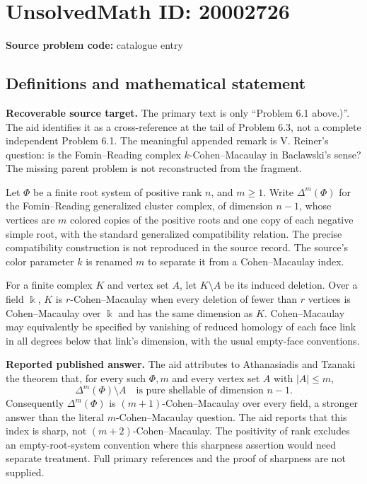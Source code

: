 \documentclass[11pt]{article}
\begin{document}
\section*{UnsolvedMath ID: 20002726}
\textbf{Source problem code:} catalogue entry
\subsection{Definitions and mathematical statement}
\textbf{Recoverable source target.} The primary text is only ``Problem 6.1 above.)''. The aid identifies it as a cross-reference at the tail of Problem 6.3, not a complete independent Problem 6.1. The meaningful appended remark is V. Reiner's question: is the Fomin--Reading complex \(k\)-Cohen--Macaulay in Baclawski's sense? The missing parent problem is not reconstructed from the fragment.

Let \(\Phi\) be a finite root system of positive rank \(n\), and \(m\geq1\). Write \(\Delta^m(\Phi)\) for the Fomin--Reading generalized cluster complex, of dimension \(n-1\), whose vertices are \(m\) colored copies of the positive roots and one copy of each negative simple root, with the standard generalized compatibility relation. The precise compatibility construction is not reproduced in the source record. The source's color parameter \(k\) is renamed \(m\) to separate it from a Cohen--Macaulay index.

For a finite complex \(K\) and vertex set \(A\), let \(K\setminus A\) be its induced deletion. Over a field \(\Bbbk\), \(K\) is \(r\)-Cohen--Macaulay when every deletion of fewer than \(r\) vertices is Cohen--Macaulay over \(\Bbbk\) and has the same dimension as \(K\). Cohen--Macaulay may equivalently be specified by vanishing of reduced homology of each face link in all degrees below that link's dimension, with the usual empty-face conventions.

\textbf{Reported published answer.} The aid attributes to Athanasiadis and Tzanaki the theorem that, for every such \(\Phi,m\) and every vertex set \(A\) with \(|A|\leq m\),
\[
 \Delta^m(\Phi)\setminus A
 \quad\text{is pure shellable of dimension }n-1.
\]
Consequently \(\Delta^m(\Phi)\) is \((m+1)\)-Cohen--Macaulay over every field, a stronger answer than the literal \(m\)-Cohen--Macaulay question. The aid reports that this index is sharp, not \((m+2)\)-Cohen--Macaulay. The positivity of rank excludes an empty-root-system convention where this sharpness assertion would need separate treatment. Full primary references and the proof of sharpness are not supplied.
\end{document}
